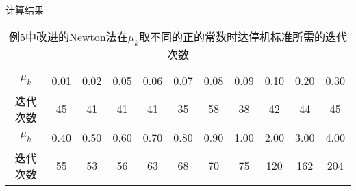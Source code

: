 \documentclass{article}
\begin{document}
\begin{section}{计算结果}
    \begin{table}[!htbp]
        \centering
        \begin{tabular}{ccccccccccc}\hline
        $\mu_k$ & 0.01 & 0.02 & 0.05 & 0.06 & 0.07 & 0.08 & 0.09 & 0.10 & 0.20 & 0.30 \\
        迭代次数    & 45   & 41   & 41   & 41   & 35   & 58   & 38   & 42   & 44   & 45   \\
        \hline
        $\mu_k$ & 0.40 & 0.50 & 0.60 & 0.70 & 0.80 & 0.90 & 1.00 & 2.00 & 3.00 & 4.00 \\
        迭代次数    & 55   & 53   & 56   & 63   & 68   & 70   & 75   & 120  & 162  & 204 \\
        \hline
        \end{tabular}
        \caption{例5中改进的Newton法在$\mu_k$取不同的正的常数时达停机标准所需的迭代次数}
        \end{table}
\end{section}
\newpage
\end{document}
